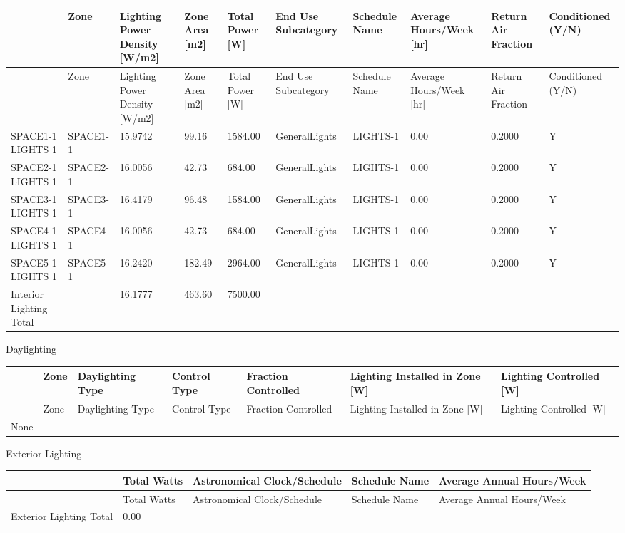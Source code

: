 {\scriptsize
\begin{longtable}[c]{>{\raggedright}p{0.6in}>{\raggedright}p{0.6in}>{\raggedright}p{0.5in}>{\raggedright}p{0.5in}>{\raggedright}p{0.5in}>{\raggedright}p{0.6in}>{\raggedright}p{0.6in}>{\raggedright}p{0.5in}>{\raggedright}p{0.5in}>{\raggedright}p{0.5in}}
\toprule
~ & Zone & Lighting Power Density [W/m2] & Zone Area [m2] & Total Power [W] & End Use Subcategory & Schedule Name & Average Hours/Week [hr] & Return Air Fraction & Conditioned (Y/N) \tabularnewline
\midrule
\endfirsthead

\toprule
~ & Zone & Lighting Power Density [W/m2] & Zone Area [m2] & Total Power [W] & End Use Subcategory & Schedule Name & Average Hours/Week [hr] & Return Air Fraction & Conditioned (Y/N) \tabularnewline
\midrule
\endhead

SPACE1-1 LIGHTS 1 & SPACE1-1 & 15.9742 & 99.16 & 1584.00 & GeneralLights & LIGHTS-1 & 0.00 & 0.2000 & Y \tabularnewline
SPACE2-1 LIGHTS 1 & SPACE2-1 & 16.0056 & 42.73 & 684.00 & GeneralLights & LIGHTS-1 & 0.00 & 0.2000 & Y \tabularnewline
SPACE3-1 LIGHTS 1 & SPACE3-1 & 16.4179 & 96.48 & 1584.00 & GeneralLights & LIGHTS-1 & 0.00 & 0.2000 & Y \tabularnewline
SPACE4-1 LIGHTS 1 & SPACE4-1 & 16.0056 & 42.73 & 684.00 & GeneralLights & LIGHTS-1 & 0.00 & 0.2000 & Y \tabularnewline
SPACE5-1 LIGHTS 1 & SPACE5-1 & 16.2420 & 182.49 & 2964.00 & GeneralLights & LIGHTS-1 & 0.00 & 0.2000 & Y \tabularnewline
Interior Lighting Total & ~ & 16.1777 & 463.60 & 7500.00 & ~ & ~ & ~ & ~ & ~ \tabularnewline
\bottomrule
\end{longtable}}

Daylighting

\begin{longtable}[c]{>{\raggedright}p{0.85in}>{\raggedright}p{0.85in}>{\raggedright}p{0.85in}>{\raggedright}p{0.85in}>{\raggedright}p{0.85in}>{\raggedright}p{0.85in}>{\raggedright}p{0.85in}}
\toprule
~ & Zone & Daylighting Type & Control Type & Fraction Controlled & Lighting Installed in Zone [W] & Lighting Controlled [W] \tabularnewline
\midrule
\endfirsthead

\toprule
~ & Zone & Daylighting Type & Control Type & Fraction Controlled & Lighting Installed in Zone [W] & Lighting Controlled [W] \tabularnewline
\midrule
\endhead

None & ~ & ~ & ~ & ~ & ~ & ~ \tabularnewline
\bottomrule
\end{longtable}

Exterior Lighting

\begin{longtable}[c]{>{\raggedright}p{1.2in}>{\raggedright}p{1.2in}>{\raggedright}p{1.2in}>{\raggedright}p{1.2in}>{\raggedright}p{1.2in}}
\toprule
~ & Total Watts & Astronomical Clock/Schedule & Schedule Name & Average Annual Hours/Week \tabularnewline
\midrule
\endfirsthead

\toprule
~ & Total Watts & Astronomical Clock/Schedule & Schedule Name & Average Annual Hours/Week \tabularnewline
\midrule
\endhead

Exterior Lighting Total & 0.00 & ~ & ~ & ~ \tabularnewline
\bottomrule
\end{longtable}

